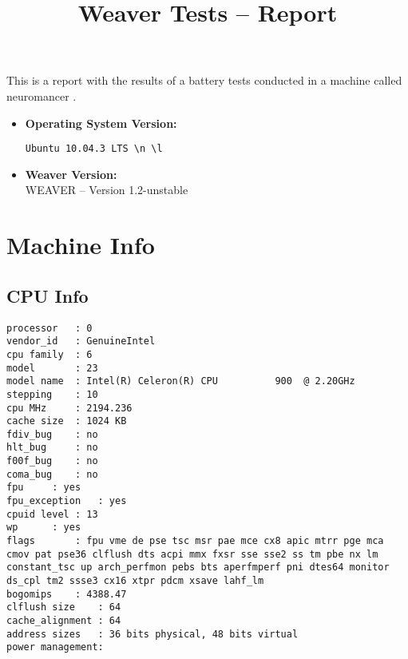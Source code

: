 \documentclass{article}
\title{Weaver Tests -- Report}
\begin{document}
\maketitle
This is a report with the results of a battery
tests conducted in a machine called 
neuromancer
.
\begin{itemize}
\item
\textbf{Operating System Version: }
\begin{verbatim}
Ubuntu 10.04.3 LTS \n \l

\end{verbatim}
\item
\textbf{Weaver Version: }\\
WEAVER -- Version 1.2-unstable
\end{itemize}
\section{Machine Info}
\subsection{CPU Info}
\begin{verbatim}
processor	: 0
vendor_id	: GenuineIntel
cpu family	: 6
model		: 23
model name	: Intel(R) Celeron(R) CPU          900  @ 2.20GHz
stepping	: 10
cpu MHz		: 2194.236
cache size	: 1024 KB
fdiv_bug	: no
hlt_bug		: no
f00f_bug	: no
coma_bug	: no
fpu		: yes
fpu_exception	: yes
cpuid level	: 13
wp		: yes
flags		: fpu vme de pse tsc msr pae mce cx8 apic mtrr pge mca cmov pat pse36 clflush dts acpi mmx fxsr sse sse2 ss tm pbe nx lm constant_tsc up arch_perfmon pebs bts aperfmperf pni dtes64 monitor ds_cpl tm2 ssse3 cx16 xtpr pdcm xsave lahf_lm
bogomips	: 4388.47
clflush size	: 64
cache_alignment	: 64
address sizes	: 36 bits physical, 48 bits virtual
power management:

\end{verbatim}
\end{document}
